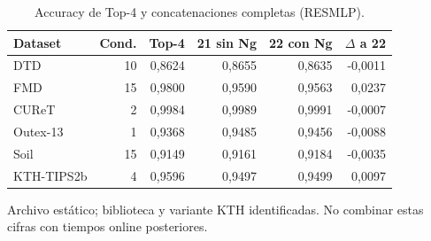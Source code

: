 \begin{table}[!htbp]\centering
\fontsize{9}{11}\selectfont\setlength{\tabcolsep}{4pt}
\caption{Accuracy de Top-4 y concatenaciones completas (RESMLP).}\label{tab:tm-top4-resmlp}
\begin{tabular}{@{}lrrrrr@{}}\toprule
Dataset & Cond. & Top-4 & 21 sin Ng & 22 con Ng & $\Delta$ a 22\\\midrule
DTD & 10 & 0,8624 & 0,8655 & 0,8635 & -0,0011\\
FMD & 15 & 0,9800 & 0,9590 & 0,9563 & 0,0237\\
CUReT & 2 & 0,9984 & 0,9989 & 0,9991 & -0,0007\\
Outex-13 & 1 & 0,9368 & 0,9485 & 0,9456 & -0,0088\\
Soil & 15 & 0,9149 & 0,9161 & 0,9184 & -0,0035\\
KTH-TIPS2b & 4 & 0,9596 & 0,9497 & 0,9499 & 0,0097\\
\bottomrule\end{tabular}
\par\smallskip\begin{minipage}{0.98\textwidth}\footnotesize Archivo estático; biblioteca y variante KTH identificadas. No combinar estas cifras con tiempos online posteriores.\end{minipage}
\end{table}
